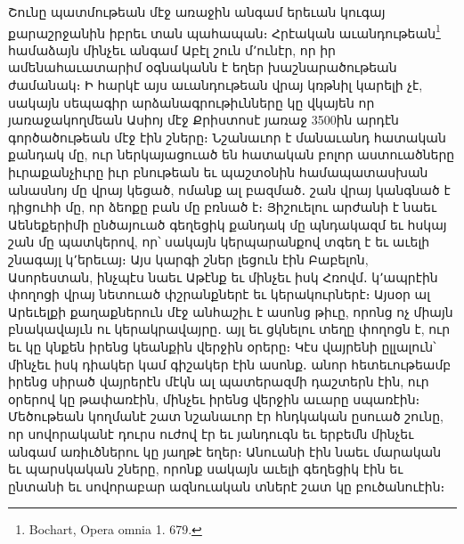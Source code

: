 \documentclass{article}
\begin{document}
{Շունը պատմութեան մէջ առաջին անգամ երեւան կուգայ քարաշրջանին իբրեւ տան պահապան։ Հրէական աւանդութեան\footnote{Bochart, Opera omnia 1. 679.} համաձայն մինչեւ անգամ Աբէլ շուն մ՚ունէր, որ իր ամենահաւատարիմ օգնականն է եղեր խաշնարածութեան ժամանակ։ Ի հարկէ այս աւանդութեան վրայ կռթնիլ կարելի չէ, սակայն սեպագիր արձանագրութիւնները կը վկայեն որ յառաջակողմեան Ասիոյ մէջ Քրիստոսէ յառաջ 3500ին արդէն գործածութեան մէջ էին շները։ Նշանաւոր է մանաւանդ հատական քանդակ մը, ուր ներկայացուած են հատական բոլոր աստուածները իւրաքանչիւրը իւր բնութեան եւ պաշտօնին համապատասխան անասնոյ մը վրայ կեցած, ոմանք ալ բազմած․ շան վրայ կանգնած է դիցուհի մը, որ ձեոքը բան մը բռնած է։ Յիշուելու արժանի է նաեւ Աենեքերիմի ընծայուած գեղեցիկ քանդակ մը պնդակազմ եւ հսկայ շան մը պատկերով, որ՝ սակայն կերպարանքով տգեղ է եւ աւելի շնագայլ կ՚երեւայ։ Այս կարգի շներ լեցուն էին Բաբելոն, Ասորեստան, ինչպէս նաեւ Աթէնք եւ մինչեւ իսկ Հռովմ․ կ՚ապրէին փողոցի վրայ նետուած փշրանքներէ եւ կերակուրներէ։ Այսօր ալ Արեւելքի քաղաքներուն մէջ անհաշիւ է ասոնց թիւը, որոնց ոչ միայն բնակավայւն ու կերակրավայրը․ այլ եւ ցկնելու տեղը փողոցն է, ուր եւ կը կնքեն իրենց կեանքին վերջին օրերը։ Կէս վայրենի ըլլալուն՝ մինչեւ իսկ դիակեր կամ գիշակեր էին ասոնք․ անոր հետեւութեամբ իրենց սիրած վայրերէն մէկն ալ պատերազմի դաշտերն էին, ուր օրերով կը թափառէին, մինչեւ իրենց վերջին աւարը սպառէին։ Մեծութեան կողմանէ շատ նշանաւոր էր հնդկական ըսուած շունը, որ սովորականէ դուրս ուժով էր եւ յանդուգն եւ երբեմն մինչեւ անգամ առիւծներու կը յաղթէ եղեր։ Անուանի էին նաեւ մարական եւ պարսկական շները, որոնք սակայն աւելի գեղեցիկ էին եւ ընտանի եւ սովորաբար ազնուական տներէ շատ կը բուծանուէին։

}
\end{document}

